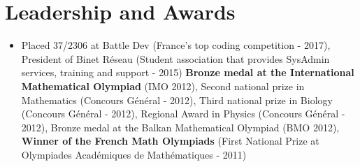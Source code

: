 \documentclass[letterpaper,10pt]{article}
\newcommand{\resumeSubHeadingListStart}{\begin{itemize}[leftmargin=*]}
\newcommand{\resumeSubHeadingListEnd}{\end{itemize}}
\newcommand{\shorterSection}[1]{\vspace{-10pt}\section{#1}}
\begin{document}
\shorterSection{Leadership and Awards}
  \resumeSubHeadingListStart
    \item[]\small{
        {Placed 37/2306 at Battle Dev (France's top coding competition - 2017), President of Binet Réseau (Student association that provides SysAdmin services, training and support - 2015) \textbf{Bronze medal at the International Mathematical Olympiad} (IMO 2012), Second national prize in Mathematics (Concours Général - 2012),  Third national prize in Biology (Concours Général - 2012),  Regional Award in Physics (Concours Général - 2012), Bronze medal at the Balkan Mathematical Olympiad (BMO 2012), \textbf{Winner of the French Math Olympiads} (First National Prize at Olympiades Académiques de Mathématiques - 2011)  \vspace{-6pt}}
    }
  \resumeSubHeadingListEnd
\end{document}
